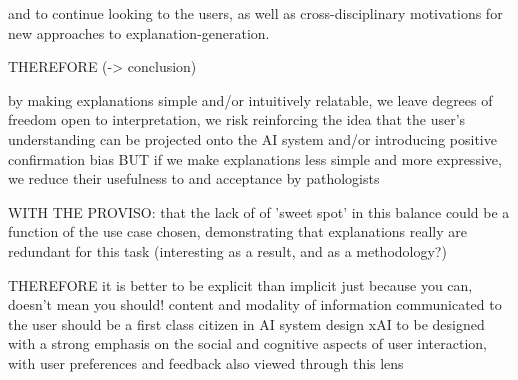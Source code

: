 and to continue looking to the users, as well as cross-disciplinary motivations for new approaches to explanation-generation.

THEREFORE (-> conclusion)

by making explanations simple and/or intuitively relatable, we leave degrees of freedom open to interpretation, we risk reinforcing the idea that the user's understanding can be projected onto the AI system and/or introducing positive confirmation bias 
BUT
if we make explanations less simple and more expressive, we reduce their usefulness to and acceptance by pathologists

WITH THE PROVISO: that the lack of of 'sweet spot' in this balance could be a function of the use case chosen, demonstrating that explanations really are redundant for this task (interesting as a result, and as a methodology?)

THEREFORE
it is better to be explicit than implicit
just because you can, doesn't mean you should!
content and modality of information communicated to the user should be a first class citizen in AI system design
xAI to be designed with a strong emphasis on the social and cognitive aspects of user interaction, with user preferences and feedback also viewed through this lens






